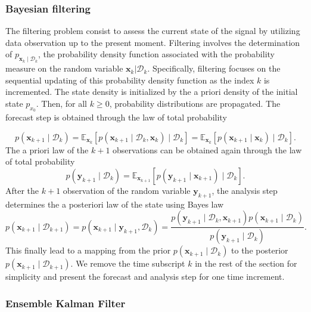 \subsubsection{Bayesian filtering}

The filtering problem consist to assess the current state of the signal by utilizing data observation up to the present moment. Filtering involves the determination of $p_{\bm x_{k} \mid \mathcal{D}_{k}}$, the probability density function associated with the probability measure on the random variable $\bm x_{k} | \mathcal D_{k}$. Specifically, filtering focuses on the sequential updating of this probability density function as the index $k$ is incremented.
The state density is initialized by the a priori density of the initial state $p_{x_0}$.
Then, for all $k \geq 0$, probability distributions are propagated.
The forecast step is obtained through the law of total probability

\begin{equation*}
    p(\bm x_{k+1} \mid \mathcal D_k) = \mathbb{E}_{\bm x_k}\left[p(\bm x_{k+1} \mid \mathcal{D}_k, \bm x_k) \mid \mathcal D_k \right] = \mathbb{E}_{\bm x_k}\left[p(\bm x_{k+1} \mid \bm x_k) \mid \mathcal D_k \right].
\end{equation*}
The a priori law of the $k+1$ observations can be obtained again through the law of total probability
\begin{equation*}
    p(\bm y_{k+1} \mid \mathcal D_k) = \mathbb{E}_{\bm{x}_{k+1}}\left[p(\bm y_{k+1}\mid \bm x_{k+1}) \mid \mathcal D_k\right].
\end{equation*}
After the $k+1$ observation of the random variable $\bm y_{k+1}$, the analysis step determines the a posteriori law of the state using Bayes law
\begin{equation*}
    p(\bm x_{k+1} \mid \mathcal D_{k+1}) = p(\bm x_{k+1} \mid \bm y_{k+1}, \mathcal D_{k})  = \frac{p(\bm y_{k+1} \mid \mathcal D_k,\bm x_{k+1})  p(\bm x_{k+1}\mid \mathcal D_k)}{p(\bm y_{k+1}\mid \mathcal D_k)}.
\end{equation*} This finally lead to a mapping from the prior $p(\bm x_{k+1} \mid \mathcal D_k)$ to the posterior $p(\bm x_{k+1} \mid \mathcal D_{k+1})$.
We remove the time subscript $k$ in the rest of the section for simplicity and present the forecast and analysis step for one time increment.

\subsubsection{Ensemble Kalman Filter}~{\label{enkf}}


